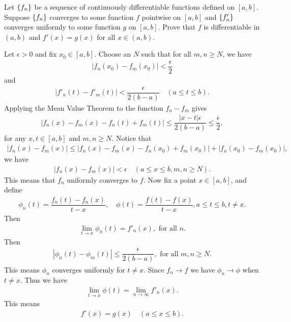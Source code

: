 \begin{problem}
Let $\left\{ f_n\right\}$ be a sequence of continuously differentiable functions defined on $[a,b]$. Suppose $\left\{ f_n\right\}$ converges to some function $f$ pointwise on $[a,b]$ and $\left\{ f'_n\right\}$ converges uniformly to some function $g$ on $[a,b]$. Prove that $f$ is differentiable in $(a,b)$ and $f'(x)=g(x)$ for all $x\in (a,b).$
\begin{solution}
Let $\epsilon > 0$ and fix $x_0 \in [a,b]$. Choose an $N$ such that for all $m, n \ge N$, we have 
\begin{align*}
    |f_n(x_0) - f_m(x_0)| < \dfrac{\epsilon}{2}
\end{align*}
and 
\begin{align*}
    |f'_n(t) - f'_m(t)| < \dfrac{\epsilon}{2(b-a)} \quad(a \le t \le b).
\end{align*}
Applying the Mean Value Theorem to the function $f_n - f_m$ gives 
\begin{align*}
    |f_n(x) - f_m(x) - f_n(t) + f_m(t)| \le \dfrac{|x-t| \epsilon}{2(b - a)} \le \dfrac{\epsilon}{2},
\end{align*}
for any $x, t \in [a,b]$ and $m, n \ge N$. Notice that 
\begin{align*}
    |f_n(x) - f_m(x)| \le |f_n(x) - f_m(x) - f_n(x_0) + f_m(x_0)| + |f_n(x_0) - f_m(x_0)|,
\end{align*}
we have 
\begin{align*}
    |f_n(x) - f_m(x)| < \epsilon \quad (a \le x \le b, m, n \ge N).
\end{align*}
This means that $f_n$ uniformly converges to $f$. Now fix a point $x \in [a,b]$, and define 
\begin{align*}
    \phi_n(t) = \dfrac{f_n(t) - f_n(x)}{t - x}, \quad \phi(t) = \dfrac{f(t) - f(x)}{t - x}, a \le t \le b, t \ne x.
\end{align*}
Then 
\begin{align*}
    \lim_{t \to x} \phi_n(t) = f'_n(x), \text{ for all } n.
\end{align*}
Then 
\begin{align*}
    |\phi_n(t) - \phi_m(t)| \le \dfrac{\epsilon}{2(b - a)}, \text{ for all } m, n \ge N.
\end{align*}
This means $\phi_n$ converges uniformly for $t \ne x$. Since $f_n \to f$ we have $\phi_n \to \phi$ when $t \ne x$. Thus we have 
\begin{align*}
    \lim_{t \to x} \phi(t) = \lim_{n \to \infty} f'_n(x).
\end{align*}
This means 
\begin{align*}
    f'(x) = g(x) \quad (a \le x \le b).
\end{align*}
\end{solution}
\end{problem}

